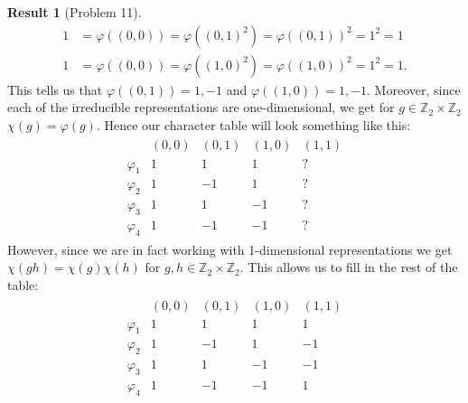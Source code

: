 \documentclass[titlepage]{article}
\theoremstyle{plain}
\theoremstyle{definition}
\newtheorem{result}{Result}[section]
\theoremstyle{remark}
\theoremstyle{exercise-style}
\numberwithin{equation}{section}
\numberwithin{theorem}{section}
\numberwithin{remark}{section}
\begin{document}
\begin{result}[Problem 11]
    \begin{align}
        1 &= \varphi((0,0)) = \varphi((0,1)^2)= \varphi ((0,1))^2 =1^2 = 1 \\
        1 &= \varphi((0,0)) = \varphi((1,0)^2)= \varphi ((1,0))^2 =1^2 = 1.
    \end{align}
    This tells us that $\varphi((0,1)) = 1,-1$ and $\varphi((1,0)) = 1, -1$. Moreover, since each of the irreducible representations are one-dimensional, we get for $g \in \mathbb Z_2 \times \mathbb Z_2$ $\chi(g) = \varphi(g)$. Hence our character table will look something like this:
    \begin{align}
        \begin{array}{c|c|c|c|c}
             & (0,0) & (0,1) & (1,0) & (1,1)\\
             \hline
            \varphi_1 & 1 & 1 & 1 & ?\\
            \varphi_2 & 1 & -1 & 1 & ?\\
            \varphi_3 & 1 & 1 & -1 & ?\\
            \varphi_4 & 1 & -1 & -1 & ?
        \end{array}
    \end{align}
    However, since we are in fact working with 1-dimensional representations we get $\chi(gh)=\chi(g)\chi(h)$ for $g,h \in \mathbb Z_2 \times \mathbb Z_2$. This allows us to fill in the rest of the table:
    \begin{align}
        \begin{array}{c|c|c|c|c}
             & (0,0) & (0,1) & (1,0) & (1,1)\\
             \hline
            \varphi_1 & 1 & 1 & 1 & 1\\
            \varphi_2 & 1 & -1 & 1 & -1\\
            \varphi_3 & 1 & 1 & -1 & -1\\
            \varphi_4 & 1 & -1 & -1 & 1
        \end{array}
    \end{align}
\end{result}
\end{document}
